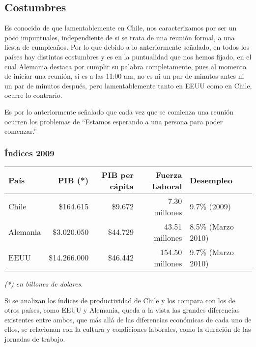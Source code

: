 
\subsection{Costumbres}
Es conocido de que lamentablemente en Chile, nos caracterizamos
por ser un poco impuntuales, independiente de si se trata de una
reunión formal, a una fiesta de cumpleaños. Por lo que debido a lo
anteriormente señalado, en todos los países hay distintas costumbres
y es en la puntualidad que nos hemos fijado, en el cual Alemania
destaca por cumplir su palabra completamente, pues al momento
de iniciar una reunión, si es a las 11:00 am, no es ni un par
de minutos antes ni un par de minutos después, pero lamentablemente
tanto en EEUU como en Chile, ocurre lo contrario.

Es por lo anteriormente señalado que cada vez que se comienza una
reunión ocurren los problemas de ``Estamos esperando a una persona
para poder comenzar.''

\subsubsection{Índices 2009}
\begin{tabular}{|l|r|r|r|l|c|}
\hline
País        & PIB (*)     & PIB per cápita    & Fuerza Laboral    & Desempleo \\%
\hline
Chile       & \$164.615                        & \$9.672           &  7.30 millones    & 9.7\% (2009)    \\%
Alemania    & \$3.020.050                      & \$44.729          & 43.51 millones    & 8.5\% (Marzo 2010) \\%
EEUU        & \$14.266.000                     & \$46.442          & 154.50 millones   & 9.7\% (Marzo 2010) \\%
\hline
\end{tabular}
\begin{center}
\vspace{-0.3cm}
\hspace{-10cm}
\emph{(*) en billones de dolares.}
\end{center}


Si se analizan los índices de productividad de Chile y los compara con los de
otros países, como EEUU y Alemania, queda a la vista las grandes diferencias
existentes entre ambos, que más allá de las diferencias económicas de cada uno
de ellos, se relacionan con la cultura y condiciones laborales, como la
duración de las jornadas de trabajo.

